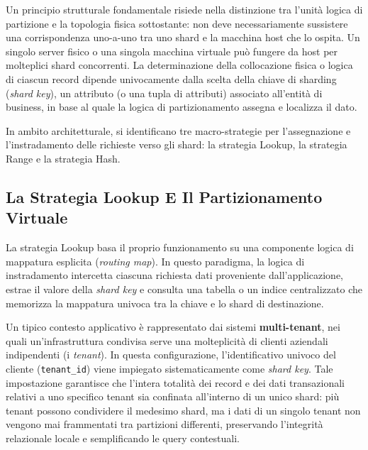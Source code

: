 \documentclass[11pt, a4paper]{article}
\begin{document}
Un principio strutturale fondamentale risiede nella distinzione tra l'unità logica di partizione e la topologia fisica sottostante: non deve necessariamente sussistere una corrispondenza uno-a-uno tra uno shard e la macchina host che lo ospita. Un singolo server fisico o una singola macchina virtuale può fungere da host per molteplici shard concorrenti. La determinazione della collocazione fisica o logica di ciascun record dipende univocamente dalla scelta della chiave di sharding (\emph{shard key}), un attributo (o una tupla di attributi) associato all'entità di business, in base al quale la logica di partizionamento assegna e localizza il dato.

In ambito architetturale, si identificano tre macro-strategie per l'assegnazione e l'instradamento delle richieste verso gli shard: la strategia Lookup, la strategia Range e la strategia Hash.

\subsection{La Strategia Lookup E Il Partizionamento Virtuale}

La strategia Lookup basa il proprio funzionamento su una componente logica di mappatura esplicita (\emph{routing map}). In questo paradigma, la logica di instradamento intercetta ciascuna richiesta dati proveniente dall'applicazione, estrae il valore della \emph{shard key} e consulta una tabella o un indice centralizzato che memorizza la mappatura univoca tra la chiave e lo shard di destinazione.

Un tipico contesto applicativo è rappresentato dai sistemi \textbf{multi-tenant}, nei quali un'infrastruttura condivisa serve una molteplicità di clienti aziendali indipendenti (i \emph{tenant}). In questa configurazione, l'identificativo univoco del cliente (\texttt{tenant\_id}) viene impiegato sistematicamente come \emph{shard key}. Tale impostazione garantisce che l'intera totalità dei record e dei dati transazionali relativi a uno specifico tenant sia confinata all'interno di un unico shard: più tenant possono condividere il medesimo shard, ma i dati di un singolo tenant non vengono mai frammentati tra partizioni differenti, preservando l'integrità relazionale locale e semplificando le query contestuali.

\end{document}
